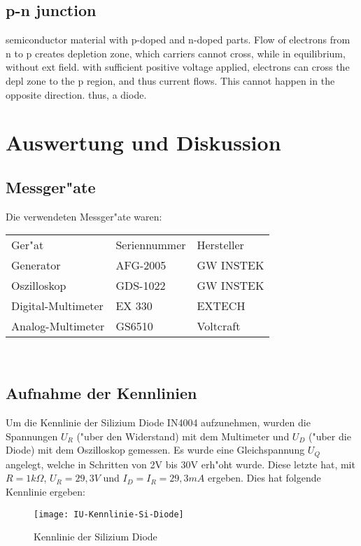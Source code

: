 \documentclass[10pt]{article}
\begin{document}
\subsection{p-n junction}
semiconductor material with p-doped and n-doped parts. Flow of electrons from n to p creates depletion zone, which carriers cannot cross, while in equilibrium, without ext field.
with sufficient positive voltage applied, electrons can cross the depl zone to the p region, and thus current flows. This cannot happen in the opposite direction. thus, a diode.


\section{Auswertung und Diskussion}
\subsection{Messger"ate}
Die verwendeten Messger"ate waren:

\begin{tabular}{l l l}
Ger"at & Seriennummer & Hersteller \\
Generator & AFG-2005 & GW INSTEK \\
Oszilloskop & GDS-1022 & GW INSTEK \\
Digital-Multimeter & EX 330 & EXTECH \\
Analog-Multimeter & GS6510 & Voltcraft\\
\end{tabular}\\

\subsection{Aufnahme der Kennlinien}
Um die Kennlinie der Silizium Diode IN4004 aufzunehmen, wurden die Spannungen $U_R$ ("uber den Widerstand) mit dem Multimeter und $U_D$ ("uber die Diode) mit dem Oszilloskop gemessen. Es wurde eine Gleichspannung $U_Q$ angelegt, welche in Schritten von 2V bis 30V erh"oht wurde. Diese letzte hat, mit $R = 1k\Omega$, $U_R = 29,3V$ und $I_D = I_R = 29,3mA$ ergeben. Dies hat folgende Kennlinie ergeben: 

\begin{figure}[h!]
  \begin{center}
    \texttt{[image: IU-Kennlinie-Si-Diode]}
    \caption{Kennlinie der Silizium Diode}
   \end{center}
\end{figure}
\end{document}
